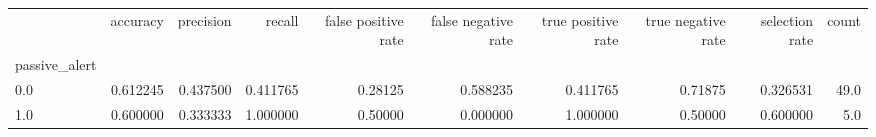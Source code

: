\begin{tabular}{lrrrrrrrrr}
\toprule
{} &  accuracy &  precision &    recall &  false positive rate &  false negative rate &  true positive rate &  true negative rate &  selection rate &  count \\
passive\_alert &           &            &           &                      &                      &                     &                     &                 &        \\
\midrule
0.0           &  0.612245 &   0.437500 &  0.411765 &              0.28125 &             0.588235 &            0.411765 &             0.71875 &        0.326531 &   49.0 \\
1.0           &  0.600000 &   0.333333 &  1.000000 &              0.50000 &             0.000000 &            1.000000 &             0.50000 &        0.600000 &    5.0 \\
\bottomrule
\end{tabular}
